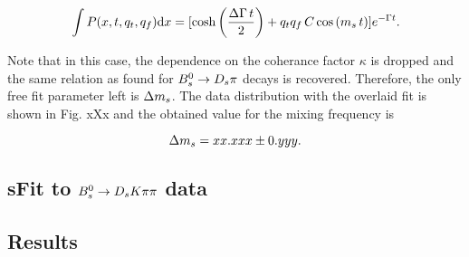 \begin{equation}
\int P(x,t,q_t,q_f) \text d x = [\text{cosh} \left( \frac{\Delta \Gamma \, t}{2}\right) + q_t q_f \, C \, \text{cos} \left( m_s \, t \right)] e^{- \Gamma t}.
\end{equation}

Note that in this case, the dependence on the coherance factor $\kappa$ is dropped and the same relation as found for ${{B}^0_{s}}\rightarrow{\ensuremath{{D}_{s}}}{\ensuremath{\pi}}$ decays is recovered. 
Therefore, the only free fit parameter left is ${\Delta m_{{s}}}$. The data distribution with the overlaid fit is shown in Fig. xXx and the obtained value for the mixing frequency is

\begin{equation}
\label{eq:dms_from_Norm}
{\ensuremath{\Delta m_{{s}}}} = xx.xxx \pm 0.yyy.
\end{equation}



\subsection{sFit to ${{B}^0_{s}}\rightarrow{\ensuremath{{D}_{s}}}{\ensuremath{K}}{\ensuremath{\pi}}{\ensuremath{\pi}}$ data}







\subsection{Results}

